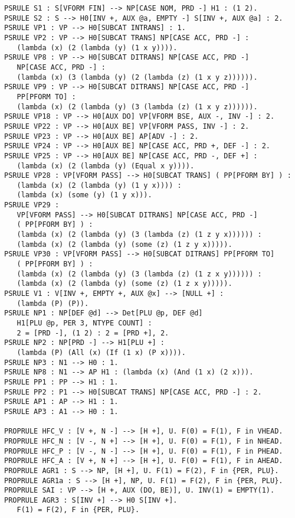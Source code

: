 {\begin{verbatim}
PSRULE S1 : S[VFORM FIN] --> NP[CASE NOM, PRD -] H1 : (1 2).
PSRULE S2 : S --> H0[INV +, AUX @a, EMPTY -] S[INV +, AUX @a] : 2.
PSRULE VP1 : VP --> H0[SUBCAT INTRANS] : 1.
PSRULE VP2 : VP --> H0[SUBCAT TRANS] NP[CASE ACC, PRD -] : 
   (lambda (x) (2 (lambda (y) (1 x y)))).
PSRULE VP8 : VP --> H0[SUBCAT DITRANS] NP[CASE ACC, PRD -]
   NP[CASE ACC, PRD -] : 
   (lambda (x) (3 (lambda (y) (2 (lambda (z) (1 x y z)))))).
PSRULE VP9 : VP --> H0[SUBCAT DITRANS] NP[CASE ACC, PRD -]
   PP[PFORM TO] : 
   (lambda (x) (2 (lambda (y) (3 (lambda (z) (1 x y z)))))).
PSRULE VP18 : VP --> H0[AUX DO] VP[VFORM BSE, AUX -, INV -] : 2.
PSRULE VP22 : VP --> H0[AUX BE] VP[VFORM PASS, INV -] : 2.
PSRULE VP23 : VP --> H0[AUX BE] AP[ADV -] : 2.
PSRULE VP24 : VP --> H0[AUX BE] NP[CASE ACC, PRD +, DEF -] : 2.
PSRULE VP25 : VP --> H0[AUX BE] NP[CASE ACC, PRD -, DEF +] : 
   (lambda (x) (2 (lambda (y) (Equal x y)))).
PSRULE VP28 : VP[VFORM PASS] --> H0[SUBCAT TRANS] ( PP[PFORM BY] ) : 
   (lambda (x) (2 (lambda (y) (1 y x)))) :
   (lambda (x) (some (y) (1 y x))).
PSRULE VP29 :
   VP[VFORM PASS] --> H0[SUBCAT DITRANS] NP[CASE ACC, PRD -] 
   ( PP[PFORM BY] ) : 
   (lambda (x) (2 (lambda (y) (3 (lambda (z) (1 z y x)))))) : 
   (lambda (x) (2 (lambda (y) (some (z) (1 z y x))))).
PSRULE VP30 : VP[VFORM PASS] --> H0[SUBCAT DITRANS] PP[PFORM TO] 
   ( PP[PFORM BY] ) : 
   (lambda (x) (2 (lambda (y) (3 (lambda (z) (1 z x y)))))) : 
   (lambda (x) (2 (lambda (y) (some (z) (1 z x y))))).
PSRULE V1 : V[INV +, EMPTY +, AUX @x] --> [NULL +] :
   (lambda (P) (P)).
PSRULE NP1 : NP[DEF @d] --> Det[PLU @p, DEF @d]
   H1[PLU @p, PER 3, NTYPE COUNT] :
   2 = [PRD -], (1 2) : 2 = [PRD +], 2.
PSRULE NP2 : NP[PRD -] --> H1[PLU +] : 
   (lambda (P) (All (x) (If (1 x) (P x)))).
PSRULE NP3 : N1 --> H0 : 1.
PSRULE NP8 : N1 --> AP H1 : (lambda (x) (And (1 x) (2 x))).
PSRULE PP1 : PP --> H1 : 1.
PSRULE PP2 : P1 --> H0[SUBCAT TRANS] NP[CASE ACC, PRD -] : 2.
PSRULE AP1 : AP --> H1 : 1.
PSRULE AP3 : A1 --> H0 : 1.

PROPRULE HFC_V : [V +, N -] --> [H +], U. F(0) = F(1), F in VHEAD.
PROPRULE HFC_N : [V -, N +] --> [H +], U. F(0) = F(1), F in NHEAD.
PROPRULE HFC_P : [V -, N -] --> [H +], U. F(0) = F(1), F in PHEAD.
PROPRULE HFC_A : [V +, N +] --> [H +], U. F(0) = F(1), F in AHEAD.
PROPRULE AGR1 : S --> NP, [H +], U. F(1) = F(2), F in {PER, PLU}.
PROPRULE AGR1a : S --> [H +], NP, U. F(1) = F(2), F in {PER, PLU}.
PROPRULE SAI : VP --> [H +, AUX (DO, BE)], U. INV(1) = EMPTY(1).
PROPRULE AGR3 : S[INV +] --> H0 S[INV +].
   F(1) = F(2), F in {PER, PLU}.


\end{verbatim}}
